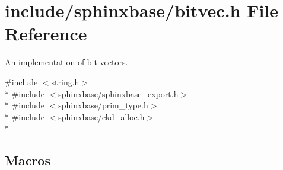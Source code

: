\section{include/sphinxbase/bitvec.h File Reference}
\label{bitvec_8h}


An implementation of bit vectors.  


{\ttfamily \#include $<$string.\-h$>$}\\*
{\ttfamily \#include $<$sphinxbase/sphinxbase\-\_\-export.\-h$>$}\\*
{\ttfamily \#include $<$sphinxbase/prim\-\_\-type.\-h$>$}\\*
{\ttfamily \#include $<$sphinxbase/ckd\-\_\-alloc.\-h$>$}\\*
\subsection*{Macros}
